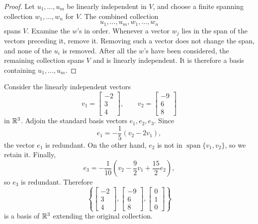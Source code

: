 \begin{proof}
  Let $u_1,\ldots,u_m$ be linearly independent in $V$, and choose a
  finite spanning collection $w_1,\ldots,w_n$ for $V$. The combined
  collection
  \[
    u_1,\ldots,u_m,w_1,\ldots,w_n
  \]
  spans $V$. Examine the $w$'s in order. Whenever a vector $w_j$ lies in
  the span of the vectors preceding it, remove it. Removing such a
  vector does not change the span, and none of the $u_i$ is removed.
  After all the $w$'s have been considered, the remaining collection
  spans $V$ and is linearly independent. It is therefore a basis
  containing $u_1,\ldots,u_m$.
\end{proof}

\begin{example}
  Consider the linearly independent vectors
  \[
    v_1=\begin{bmatrix}-2\\3\\4\end{bmatrix},
    \qquad
    v_2=\begin{bmatrix}-9\\6\\8\end{bmatrix}
  \]
  in $\mathbb{R}^3$. Adjoin the standard basis vectors
  $e_1,e_2,e_3$. Since
  \[
    e_1=-\frac15(v_2-2v_1),
  \]
  the vector $e_1$ is redundant. On the other hand, $e_2$ is not in
  $\operatorname{span}\{v_1,v_2\}$, so we retain it. Finally,
  \[
    e_3=-\frac1{10}\left(v_2-\frac92v_1+\frac{15}{2}e_2\right),
  \]
  so $e_3$ is redundant. Therefore
  \[
    \left\{
      \begin{bmatrix}-2\\3\\4\end{bmatrix},
      \begin{bmatrix}-9\\6\\8\end{bmatrix},
      \begin{bmatrix}0\\1\\0\end{bmatrix}
    \right\}
  \]
  is a basis of $\mathbb{R}^3$ extending the original collection.
\end{example}
